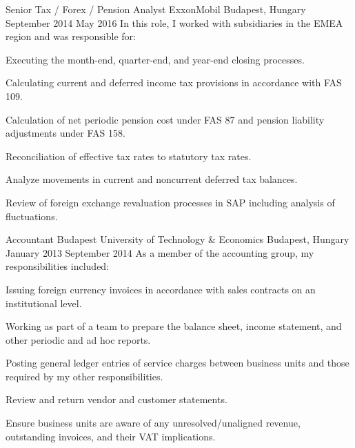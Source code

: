 \begin{cventries}

  \cventry
    {Senior Tax / Forex / Pension Analyst} %
    {ExxonMobil} %
    {Budapest, Hungary} %
    {September 2014 \textendash May 2016} %
    {In this role, I worked with subsidiaries in the EMEA region and was responsible for:} %
    {
      \begin{cvitems} %
        \item {Executing the month-end, quarter-end, and year-end closing processes.}
        \item {Calculating current and deferred income tax provisions in accordance with FAS 109.}
        \item {Calculation of net periodic pension cost under FAS 87 and pension liability adjustments under FAS 158.}
        \item {Reconciliation of effective tax rates to statutory tax rates.}
        \item {Analyze movements in current and noncurrent deferred tax balances.}
        \item {Review of foreign exchange revaluation processes in SAP \textendash including analysis of fluctuations.}
      \end{cvitems}
    }


  \cventry
    {Accountant} %
    {Budapest University of Technology \& Economics} %
    {Budapest, Hungary} %
    {January 2013 \textendash September 2014} %
    {As a member of the accounting group, my responsibilities included:} %
    {
      \begin{cvitems} %
        \item {Issuing foreign currency invoices in accordance with sales contracts on an institutional level.}
        \item {Working as part of a team to prepare the balance sheet, income statement, and other periodic and ad hoc reports.}
        \item {Posting general ledger entries of service charges between business units and those required by my other responsibilities.}
        \item {Review and return vendor and customer statements.}
        \item {Ensure business units are aware of any unresolved/unaligned revenue, outstanding invoices, and their VAT implications.}
      \end{cvitems}
    }


\end{cventries}
